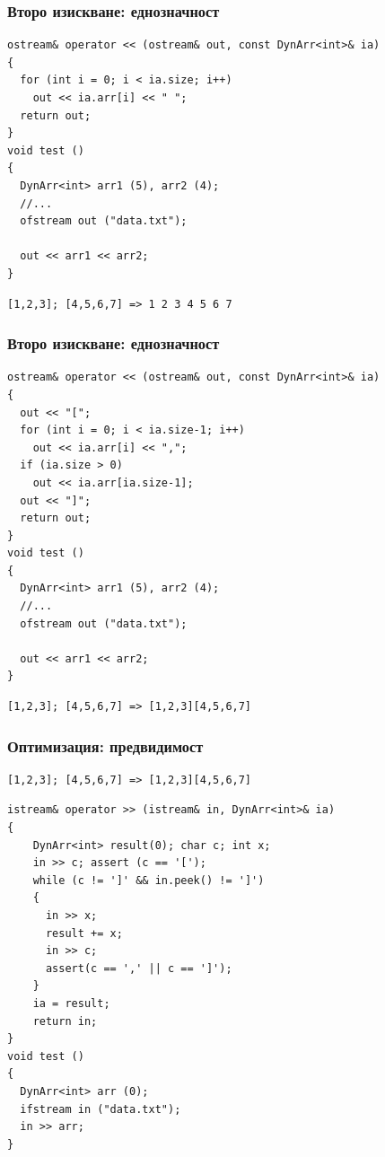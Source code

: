 \documentclass{beamer}
\begin{document}
\begin{frame}[fragile]
\frametitle{Второ изискване: еднозначност}

\begin{flushleft}
\begin{lstlisting}
ostream& operator << (ostream& out, const DynArr<int>& ia)
{
  for (int i = 0; i < ia.size; i++)
    out << ia.arr[i] << " ";
  return out;
}
void test ()
{
  DynArr<int> arr1 (5), arr2 (4);
  //...
  ofstream out ("data.txt");

  out << arr1 << arr2;
}
\end{lstlisting}  
\end{flushleft}

\begin{lstlisting}
[1,2,3]; [4,5,6,7] => 1 2 3 4 5 6 7
\end{lstlisting}  

\end{frame}


\begin{frame}[fragile]
\frametitle{Второ изискване: еднозначност}


\begin{flushleft}
\begin{lstlisting}
ostream& operator << (ostream& out, const DynArr<int>& ia)
{
  out << "[";
  for (int i = 0; i < ia.size-1; i++)
    out << ia.arr[i] << ",";
  if (ia.size > 0)
    out << ia.arr[ia.size-1];
  out << "]";
  return out;
}
void test ()
{
  DynArr<int> arr1 (5), arr2 (4);
  //...
  ofstream out ("data.txt");

  out << arr1 << arr2;
}
\end{lstlisting}  
\end{flushleft}

\begin{lstlisting}
[1,2,3]; [4,5,6,7] => [1,2,3][4,5,6,7]
\end{lstlisting}  

\end{frame}



\begin{frame}[fragile]
\frametitle{Оптимизация: предвидимост}

\begin{lstlisting}
[1,2,3]; [4,5,6,7] => [1,2,3][4,5,6,7]
\end{lstlisting}  

\begin{flushleft}
\begin{lstlisting}
istream& operator >> (istream& in, DynArr<int>& ia)
{
    DynArr<int> result(0); char c; int x;
    in >> c; assert (c == '[');
    while (c != ']' && in.peek() != ']')
    {
      in >> x;
      result += x;
      in >> c;
      assert(c == ',' || c == ']');
    }
    ia = result;
    return in;
}
void test ()
{
  DynArr<int> arr (0);
  ifstream in ("data.txt");
  in >> arr;
}
\end{lstlisting}  
\end{flushleft}


\end{frame}
\end{document}
